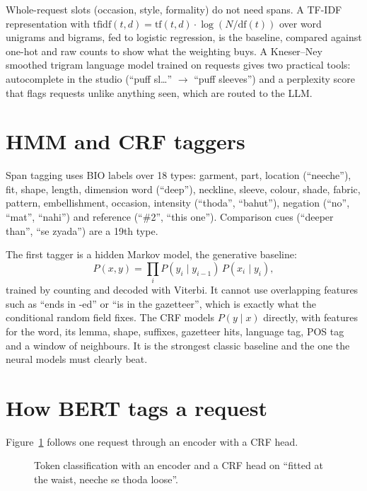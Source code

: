 Whole-request slots (occasion, style, formality) do not need spans. A TF-IDF representation with $\mathrm{tfidf}(t,d)=\mathrm{tf}(t,d)\cdot\log(N/\mathrm{df}(t))$ over word unigrams and bigrams, fed to logistic regression, is the baseline, compared against one-hot and raw counts to show what the weighting buys. A Kneser--Ney smoothed trigram language model trained on requests gives two practical tools: autocomplete in the studio (``puff sl\ldots'' $\to$ ``puff sleeves'') and a perplexity score that flags requests unlike anything seen, which are routed to the LLM.

\section{HMM and CRF taggers}

Span tagging uses BIO labels over 18 types: garment, part, location (``neeche''), fit, shape, length, dimension word (``deep''), neckline, sleeve, colour, shade, fabric, pattern, embellishment, occasion, intensity (``thoda'', ``bahut''), negation (``no'', ``mat'', ``nahi'') and reference (``\#2'', ``this one''). Comparison cues (``deeper than'', ``se zyada'') are a 19th type.

The first tagger is a hidden Markov model, the generative baseline:
\begin{equation}
P(x, y) = \prod_{i} P(y_i \mid y_{i-1})\,P(x_i \mid y_i),
\end{equation}
trained by counting and decoded with Viterbi. It cannot use overlapping features such as ``ends in -ed'' or ``is in the gazetteer'', which is exactly what the conditional random field \cite{lafferty2001crf} fixes. The CRF models $P(y\mid x)$ directly, with features for the word, its lemma, shape, suffixes, gazetteer hits, language tag, POS tag and a window of neighbours. It is the strongest classic baseline and the one the neural models must clearly beat.

\section{How BERT tags a request}

Figure~\ref{fig:bert} follows one request through an encoder with a CRF head.

\begin{figure}[h]
\centering
\caption{Token classification with an encoder and a CRF head on ``fitted at the waist, neeche se thoda loose''.}\label{fig:bert}
\end{figure}

